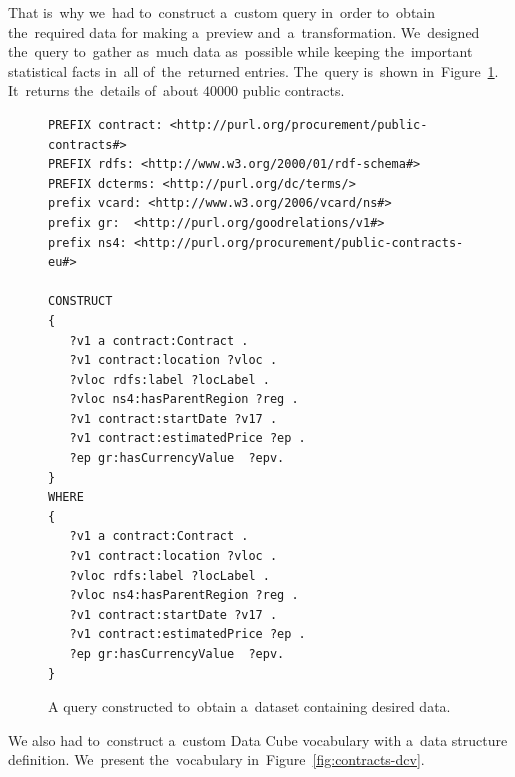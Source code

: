 That is~why we~had to~construct a~custom query in~order to~obtain the~required 
data for making a~preview and~a~transformation. We~designed the~query to~gather as~much data as~possible while keeping the~important statistical facts in~all of~the~returned entries. The~query is~shown in~Figure~\ref{fig:contracts-query}. It~returns the~details of~about $40000$ public 
contracts.

\begin{figure}
  \scriptsize
  \begin{verbatim}
PREFIX contract: <http://purl.org/procurement/public-contracts#>
PREFIX rdfs: <http://www.w3.org/2000/01/rdf-schema#>
PREFIX dcterms: <http://purl.org/dc/terms/>
prefix vcard: <http://www.w3.org/2006/vcard/ns#> 
prefix gr:	<http://purl.org/goodrelations/v1#> 
prefix ns4:	<http://purl.org/procurement/public-contracts-eu#>

CONSTRUCT 
{
   ?v1 a contract:Contract .
   ?v1 contract:location ?vloc .
   ?vloc rdfs:label ?locLabel .
   ?vloc ns4:hasParentRegion ?reg .
   ?v1 contract:startDate ?v17 .
   ?v1 contract:estimatedPrice ?ep .
   ?ep gr:hasCurrencyValue	?epv.
}
WHERE
{
   ?v1 a contract:Contract .
   ?v1 contract:location ?vloc .
   ?vloc rdfs:label ?locLabel .
   ?vloc ns4:hasParentRegion ?reg .
   ?v1 contract:startDate ?v17 .
   ?v1 contract:estimatedPrice ?ep .
   ?ep gr:hasCurrencyValue	?epv.
}
  \end{verbatim}
  \caption{A query constructed to~obtain a~dataset containing desired data.}
  \label{fig:contracts-query}
\end{figure}

We also had to~construct a~custom Data Cube vocabulary with a~data structure 
definition. We~present the~vocabulary in~Figure~\ref{fig:contracts-dcv}.

